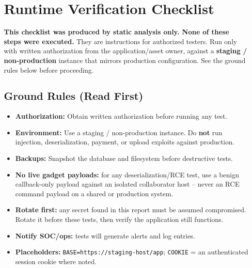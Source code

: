 \chapter{Runtime Verification Checklist}
\label{app:runtime}

\begin{warningbox}
  \textbf{This checklist was produced by static analysis only. None of these steps were
  executed.} They are instructions for authorized testers. Run only with written authorization
  from the application/asset owner, against a \textbf{staging / non-production} instance that
  mirrors production configuration. See the ground rules below before proceeding.
\end{warningbox}

\section{Ground Rules (Read First)}
\label{sec:rt_ground_rules}

\begin{itemize}
  \item[\(\square\)] \textbf{Authorization:} Obtain written authorization before running any test.
  \item[\(\square\)] \textbf{Environment:} Use a staging / non-production instance. Do
    \textbf{not} run injection, deserialization, payment, or upload exploits against production.
  \item[\(\square\)] \textbf{Backups:} Snapshot the database and filesystem before destructive
    tests.
  \item[\(\square\)] \textbf{No live gadget payloads:} for any deserialization/RCE test, use a
    benign callback-only payload against an isolated collaborator host -- never an RCE command
    payload on a shared or production system.
  \item[\(\square\)] \textbf{Rotate first:} any secret found in this report must be assumed
    compromised. Rotate it before these tests, then verify the application still functions.
  \item[\(\square\)] \textbf{Notify SOC/ops:} tests will generate alerts and log entries.
  \item[\(\square\)] \textbf{Placeholders:} \texttt{BASE=https://staging-host/app};
    \texttt{COOKIE} = an authenticated session cookie where noted.
\end{itemize}

